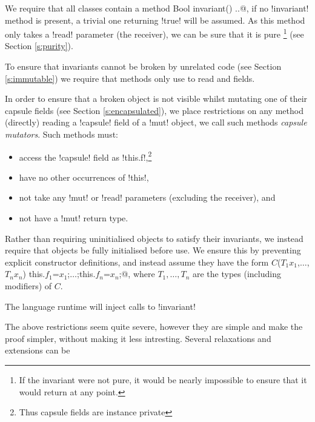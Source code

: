 We require that all classes contain a \Q@read method Bool invariant() {..}@, if no \Q!invariant! method is present, a trivial one returning \Q!true! will be assumed. As this method only takes a \Q!read! parameter (the receiver), we can be sure that it is pure \footnote{If the invariant were not pure, it would be nearly impossible to ensure that it would return \Q@true@ at any point.} (see Section \ref{s:purity}).

To ensure that invariants cannot be broken by unrelated code (see Section \ref{s:immutable}) we require that \Q@invariant@ methods only use \Q@this@ to read \Q@imm@ and \Q@capsule@ fields.

In order to ensure that a broken object is not visible whilst mutating one of their capsule fields (see Section \ref{s:encapsulated}), we place restrictions on any method (directly) reading a \Q!capsule! field of a \Q!mut! object, we call such methods \emph{capsule mutators}. Such methods must:
\begin{itemize}
\item access the \Q!capsule! field as \Q!this.f!,\footnote{Thus capsule fields are instance private}
\item have no other occurrences of \Q!this!,
\item not take any \Q!mut! or \Q!read! parameters (excluding the receiver), and
\item not have a \Q!mut! return type.
\end{itemize}
%
Rather than requiring uninitialised objects to satisfy their invariants, we instead require that objects be fully initialised before use. We ensure this by preventing explicit constructor definitions, and instead assume they have the form \Q@$C$($T_1 x_1$,$\ldots$,$T_n x_n$) {this.$f_1$=$x_1$;$\ldots$;this.$f_n$=$x_n$;}@, where $T_1, \ldots, T_n$ are the types (including modifiers) of $C$.

The language runtime will inject calls to \Q!invariant! 

The above restrictions seem quite severe, however they are simple and make the proof simpler, without making it less intresting. Several relaxations and extensions can be


